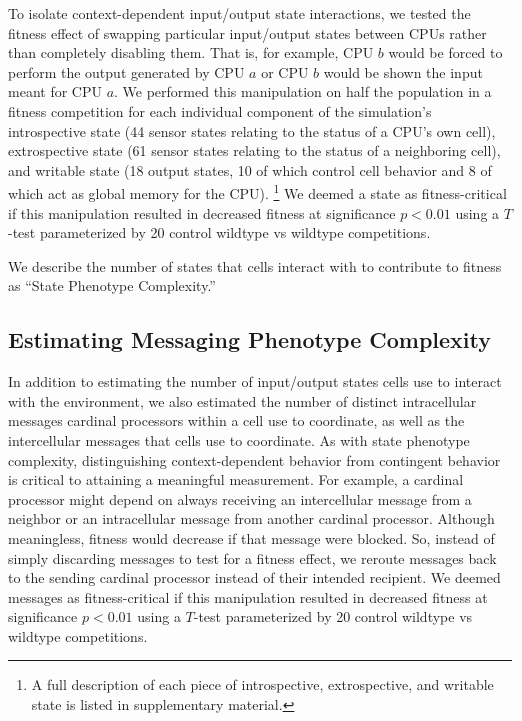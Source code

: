 To isolate context-dependent input/output state interactions, we tested the fitness effect of swapping particular input/output states between CPUs rather than completely disabling them.
That is, for example, CPU $b$ would be forced to perform the output generated by CPU $a$ or CPU $b$ would be shown the input meant for CPU $a$.
We performed this manipulation on half the population in a fitness competition for each individual component of the simulation's introspective state (44 sensor states relating to the status of a CPU's own cell), extrospective state (61 sensor states relating to the status of a neighboring cell), and writable state (18 output states, 10 of which control cell behavior and 8 of which act as global memory for the CPU).%
\footnote{
A full description of each piece of introspective, extrospective, and writable state is listed in supplementary material.
}
We deemed a state as fitness-critical if this manipulation resulted in decreased fitness at significance $p < 0.01$ using a $T$-test parameterized by 20 control wildtype vs wildtype competitions.

We describe the number of states that cells interact with to contribute to fitness as ``State Phenotype Complexity.''

\subsection{Estimating Messaging Phenotype Complexity}
\label{sec:estimating-messaging-interface-complexity;ch:measuring-cna}

In addition to estimating the number of input/output states cells use to interact with the environment, we also estimated the number of distinct intracellular messages cardinal processors within a cell use to coordinate, as well as the intercellular messages that cells use to coordinate.
As with state phenotype complexity, distinguishing context-dependent behavior from contingent behavior is critical to attaining a meaningful measurement.
For example, a cardinal processor might depend on always receiving an intercellular message from a neighbor or an intracellular message from another cardinal processor.
Although meaningless, fitness would decrease if that message were blocked.
So, instead of simply discarding messages to test for a fitness effect, we reroute messages back to the sending cardinal processor instead of their intended recipient.
We deemed messages as fitness-critical if this manipulation resulted in decreased fitness at significance $p < 0.01$ using a $T$-test parameterized by 20 control wildtype vs wildtype competitions.

